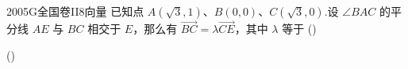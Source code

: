 
\begin{problem}{2005}{G}{全国卷II}{8}{向量}
已知点 $ A(\sqrt{3},1) $、$ B(0,0) $、$ C(\sqrt{3},0) $.设 $ \angle BAC $ 的平分线 $ AE $ 与 $ BC $ 相交于 $ E $，那么有 $ \overrightarrow{BC}=\lambda\overrightarrow{CE} $，其中 $ \lambda $ 等于 (\hspace{1cm})

(\hspace{1cm})
\begin{choices}
\end{choices}
\end{problem}

\begin{answer}

\end{answer}

\begin{solutions}

\end{solutions}